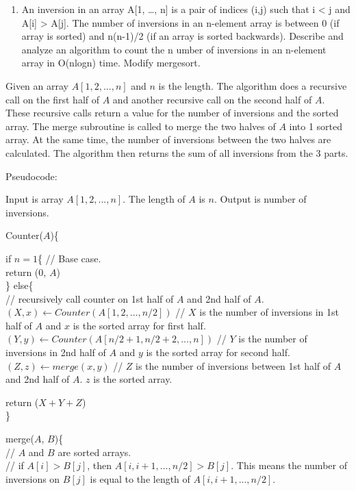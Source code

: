 \documentclass[11pt]{article}
\providecommand{\tightlist}{%
      \setlength{\itemsep}{0pt}\setlength{\parskip}{0pt}}
\begin{document}
    \begin{enumerate}
\def\labelenumi{\arabic{enumi}.}
\setcounter{enumi}{2}
\tightlist
\item
  An inversion in an array A{[}1, \ldots, n{]} is a pair of indices
  (i,j) such that i \textless{} j and A{[}i{]} \textgreater{} A{[}j{]}.
  The number of inversions in an n-element array is between 0 (if array
  is sorted) and n(n-1)/2 (if an array is sorted backwards). Describe
  and analyze an algorithm to count the n umber of inversions in an
  n-element array in O(nlogn) time. Modify mergesort.
\end{enumerate}

    Given an array \(A[1, 2, ..., n]\) and \(n\) is the length. The
algorithm does a recursive call on the first half of \(A\) and another
recursive call on the second half of \(A\). These recursive calls return
a value for the number of inversions and the sorted array. The merge
subroutine is called to merge the two halves of \(A\) into 1 sorted
array. At the same time, the number of inversions between the two halves
are calculated. The algorithm then returns the sum of all inversions
from the 3 parts.

Pseudocode:

Input is array \(A[1, 2, ..., n]\). The length of \(A\) is \(n\). Output
is number of inversions.

Counter(\(A\))\{

if \(n=1\)\{ // Base case.\\
return (0, \(A\))\\
\} else\{\\
// recursively call counter on 1st half of \(A\) and 2nd half of
\(A\).\\
\((X,x) \leftarrow Counter(A[1, 2, ..., n/2])\) // \(X\) is the number
of inversions in 1st half of \(A\) and \(x\) is the sorted array for
first half.\\
\((Y,y) \leftarrow Counter(A[n/2 +1, n/2 + 2, ..., n])\) // \(Y\) is the
number of inversions in 2nd half of \(A\) and \(y\) is the sorted array
for second half.\\
\((Z,z) \leftarrow merge(x,y)\) // \(Z\) is the number of inversions
between 1st half of \(A\) and 2nd half of \(A\). \(z\) is the sorted
array.

return (\(X+Y+Z\))\\
\}

merge(\(A\), \(B\))\{\\
// \(A\) and \(B\) are sorted arrays.\\
// if \(A[i] > B[j]\), then \(A[i, i+1, ..., n/2] > B[j]\). This means
the number of inversions on \(B[j]\) is equal to the length of
\(A[i, i+1, ..., n/2]\).
\end{document}
